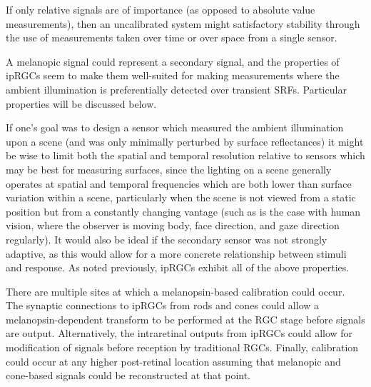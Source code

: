 If only relative signals are of importance (as opposed to absolute value measurements), then an uncalibrated system might satisfactory stability through the use of measurements taken over time or over space from a single sensor.

A melanopic signal could represent a secondary signal, and the properties of \glspl{ipRGC} seem to make them well-suited for making measurements where the ambient illumination is preferentially detected over transient \glspl{SRF}. Particular properties will be discussed below.

If one's goal was to design a sensor which measured the ambient illumination upon a scene (and was only minimally perturbed by surface reflectances) it might be wise to limit both the spatial and temporal resolution relative to sensors which may be best for measuring surfaces, since the lighting on a scene generally operates at spatial and temporal frequencies which are both lower than surface variation within a scene, particularly when the scene is not viewed from a static position but from a constantly changing vantage (such as is the case with human vision, where the observer is moving body, face direction, and gaze direction regularly). It would also be ideal if the secondary sensor was not strongly adaptive, as this would allow for a more concrete relationship between stimuli and response. As noted previously, \glspl{ipRGC} exhibit all of the above properties.

There are multiple sites at which a melanopsin-based calibration could occur. The synaptic connections to \glspl{ipRGC} from rods and cones could allow a melanopsin-dependent transform to be performed at the \gls{RGC} stage before signals are output. Alternatively, the intraretinal outputs from \glspl{ipRGC} could allow for modification of signals before reception by traditional \glspl{RGC}. Finally, calibration could occur at any higher post-retinal location assuming that melanopic and cone-based signals could be reconstructed at that point.





\clearpage


